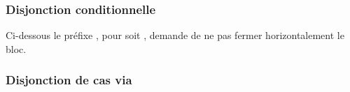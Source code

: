 \documentclass[12pt,a4paper]{article}
\begin{document}


\subsubsection{Disjonction conditionnelle \txtIf*}

Ci-dessous le préfixe , pour  soit , demande de ne pas fermer horizontalement le bloc.





\subsubsection{Disjonction de cas via \txtSwitch*}

\end{document}
